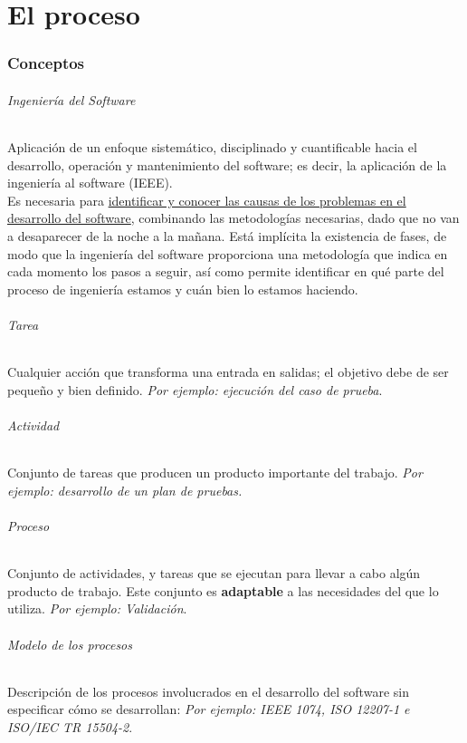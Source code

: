 \part{El proceso}

\section{Conceptos}

\paragraph{Ingeniería del Software} Aplicación de un enfoque sistemático, disciplinado y cuantificable hacia el desarrollo, operación y mantenimiento del software; es decir, la aplicación de la ingeniería al software (IEEE).\\

Es necesaria para \uline{identificar y conocer las causas de los problemas en el desarrollo del software}, combinando las metodologías necesarias, dado que no van a desaparecer de la noche a la mañana. Está implícita la existencia de fases, de modo que la ingeniería del software proporciona una metodología que indica en cada momento los pasos a seguir, así como permite identificar en qué parte del proceso de ingeniería estamos y cuán bien lo estamos haciendo.

\paragraph{Tarea} Cualquier acción que transforma una entrada en salidas; el objetivo debe de ser pequeño y bien definido. \textit{Por ejemplo: ejecución del caso de prueba}.


\paragraph{Actividad} Conjunto de tareas que producen un producto importante del trabajo. \textit{Por ejemplo: desarrollo de un plan de pruebas.}

\paragraph{Proceso} Conjunto de actividades, y tareas que se ejecutan para llevar a cabo algún producto de trabajo. Este conjunto es \textbf{adaptable} a las necesidades del que lo utiliza. \textit{Por ejemplo: Validación}.

\paragraph{Modelo de los procesos} Descripción de los procesos involucrados en el desarrollo del software sin especificar cómo se desarrollan: \textit{Por ejemplo: IEEE 1074, ISO 12207-1 e ISO/IEC TR 15504-2}.

